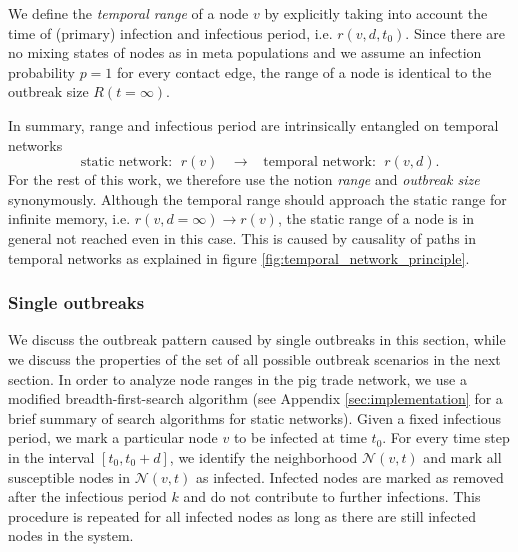We define the \emph{temporal range} of a node $v$ by explicitly taking into account the time of (primary) infection and infectious period, i.e. $r(v,d,t_0)$.
Since there are no mixing states of nodes as in meta populations and we assume an infection probability $p=1$ for every contact edge, the range of a node is identical to the outbreak size $R(t=\infty )$. 

In summary, range and infectious period are intrinsically entangled on temporal networks
\begin{equation}\label{eq:range_and_inf_period}
\text{static network: } \; r(v) \;\;\; \rightarrow   \;\;\; \text{temporal network: } \; r(v,d) .
\end{equation}
For the rest of this work, we therefore use the notion \emph{range} and \emph{outbreak size} synonymously.
Although the temporal range should approach the static range for infinite memory, i.e. $r(v,d=\infty ) \rightarrow r(v)$, the static range of a node is in general not reached even in this case.
This is caused by causality of paths in temporal networks as explained in figure \ref{fig:temporal_network_principle}.

\subsubsection{Single outbreaks}
We discuss the outbreak pattern caused by single outbreaks in this section, while we discuss the properties of the set of all possible outbreak scenarios in the next section.
In order to analyze node ranges in the pig trade network, we use a modified breadth-first-search algorithm (see Appendix \ref{sec:implementation} for a brief summary of search algorithms for static networks).
Given a fixed infectious period, we mark a particular node $v$ to be infected at time $t_0$.
For every time step in the interval $[t_0,t_0+d]$, we identify the neighborhood $\mathcal{N}(v,t)$ and mark all susceptible nodes in $\mathcal{N}(v,t)$ as infected.
Infected nodes are marked as removed after the infectious period $k$ and do not contribute to further infections.
This procedure is repeated for all infected nodes as long as there are still infected nodes in the system.

